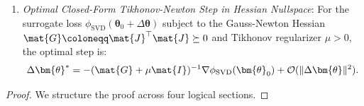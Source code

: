 \begin{theorem}
\begin{enumerate}
    where $\Gamma = \frac{1}{2} \|\mat{H}^{-1}\|_2^2 < \infty$.
    \item \emph{Optimal Closed-Form Tikhonov-Newton Step in Hessian Nullspace}:
    For the surrogate loss $\phi_{\text{SVD}}(\bm{\theta}_0 + \Delta\bm{\theta})$ subject to the Gauss-Newton Hessian $\mat{G} \coloneqq \mat{J}^\top \mat{J} \succeq 0$ and Tikhonov regularizer $\mu > 0$, the optimal step is:
    \begin{equation}
    \Delta\bm{\theta}^* = -(\mat{G} + \mu \mat{I})^{-1} \nabla \phi_{\text{SVD}}(\bm{\theta}_0) + \mathcal{O}(\|\Delta\bm{\theta}\|^2).
    \label{eq:hnc_newton_step_closed_form}
    \end{equation}
\end{enumerate}
\end{theorem}

\begin{proof}
We structure the proof across four logical sections.


\end{proof}
